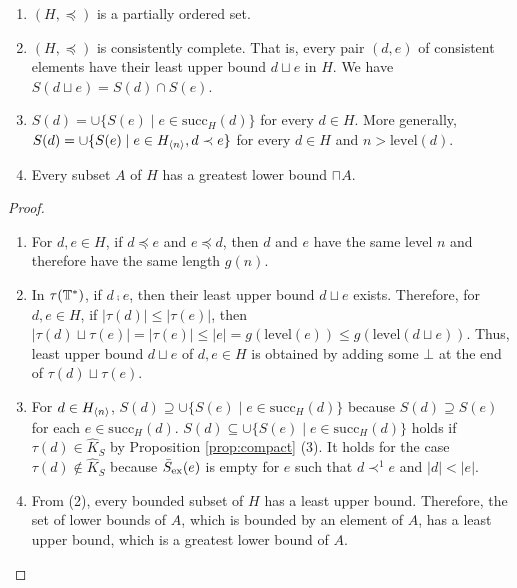 \documentclass{eptcs-modified}
\begin{document}
\begin{lemma}\label{lemma:lub}
\begin{enumerate}
\item   $(H, \preceq)$ is a partially ordered set.

\item   $(H, \preceq)$ is consistently complete.  That is, every pair $(d, e)$ of consistent elements have
  their least upper bound $d \sqcup e$ in $H$.  We have $S(d \sqcup e) = S(d) \cap S(e)$.

\item  $S(d) = \cup \{S(e) \mid e \in \mathrm{succ}_H(d) \}$ for every $d \in H$.
  More generally,
$S(d) = \cup \{S(e) \mid e \in {{H_{{\langle n\rangle}}}}, d \prec e \}$ for every $d \in H$ and $n >  \mathrm{level}(d)$.

\item  Every subset $A$ of $H$ has a greatest lower bound $\sqcap A$.
\end{enumerate}
\begin{proof}
\begin{enumerate}
\item  For $d, e \in H$,  if  $d\preceq e$ and $e\preceq d$,
then $d$ and $e$ have the same level $n$ and therefore
have the same length $g(n)$.

\item In $\tau(\mathbb{T}^*)$, if $d \comp e$, then their least upper bound $d \sqcup e$ exists.   Therefore, for $d, e \in H$,
   if $|\tau(d)| \leq |\tau(e)|$, then
   $|\tau(d) \sqcup \tau(e)| = |\tau(e)| \leq |e| = g(\mathrm{level}(e)) \leq g(\mathrm{level}(d \sqcup e))$.
   Thus, least upper bound $d \sqcup e$ of $d, e \in H$ is obtained by adding some
   $\bot$ at the end of $\tau(d) \sqcup \tau(e)$.

\item For $d \in {{H_{{\langle n\rangle}}}}$,
$S(d) \supseteq \cup \{S(e) \mid e \in \mathrm{succ}_H(d) \}$ because $S(d) \supseteq S(e)$ for each $e \in \mathrm{succ}_H(d)$.
$S(d) \subseteq \cup \{S(e) \mid e \in \mathrm{succ}_H(d) \}$
holds if $\tau(d) \in \widehat{K}_{S}$ by Proposition \ref{prop:compact} (3).
It holds for the case $\tau(d) \not \in \widehat{K}_{S}$ because
$\bar{S}_{\mathrm{ex}}(e) $ is empty for $e$ such that $d \prec^1 e$ and $|d| < |e|$.

\item From (2), every bounded subset of $H$ has a least upper bound.
   Therefore, the set of lower bounds of $A$, which is bounded by an element of $A$, has a least upper bound, which is a greatest lower bound of $A$.
 \end{enumerate}
\end{proof}
\end{lemma}
\end{document}
